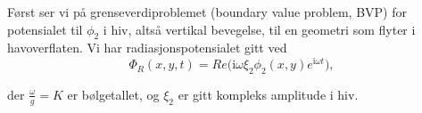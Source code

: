Først ser vi på grenseverdiproblemet (boundary value problem, BVP) for potensialet til $\phi_2$ i hiv, altså vertikal bevegelse, til en geometri som flyter i havoverflaten. Vi har radiasjonspotensialet gitt ved
\begin{equation}
\Phi_R(x,y,t) = Re\Big( \mathrm{i} \omega \xi_2 \phi_2(x,y) e^{\mathrm{i} \omega t} \Big), 
\end{equation}

der $\frac{\omega}{g} = K$ er bølgetallet, og $\xi_2$ er gitt kompleks amplitude i hiv.

